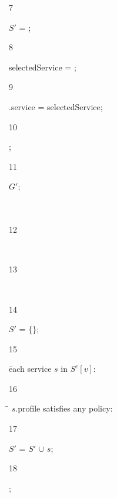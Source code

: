 \begin{figure}[!t]
\begin{ourcolor}
\begin{tabbing}
      \begin{redtext}7\end{redtext}\tabone $S'$ = ;\\
      \begin{redtext}8\end{redtext}\tabone selectedService = ;\\
      \begin{redtext}9\end{redtext}\tabone \vii{}.service = selectedService;\\
      \begin{redtext}10\end{redtext};\\
      \begin{redtext}11\end{redtext} $G'$;\\
      \\
      \\
      \begin{redtext}12\end{redtext}\\
      \begin{redtext}13\end{redtext}\\
      \begin{redtext}14\end{redtext}$S'$ = $\{\}$;\\
      \begin{redtext}15\end{redtext} \= each service $s$ in $S^c[v]$:\\
      \begin{redtext}16\end{redtext}\tabone {} \= $s$.profile satisfies any policy:\\
      \begin{redtext}17\end{redtext}\tabtwo $S'$ = $S'$ $\cup$ $s$;\\
      \begin{redtext}18\end{redtext}\tabone{};\\

\end{tabbing}
\end{ourcolor}
\end{figure}
